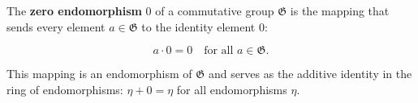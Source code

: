 The \textbf{zero endomorphism} $0$ of a commutative group $\mathfrak{G}$ is the mapping that sends every element $a \in \mathfrak{G}$ to the identity element $0$:

$$a \cdot 0 = 0 \quad \text{for all } a \in \mathfrak{G}.$$

This mapping is an endomorphism of $\mathfrak{G}$ and serves as the additive identity in the ring of endomorphisms: $\eta + 0 = \eta$ for all endomorphisms $\eta$.
